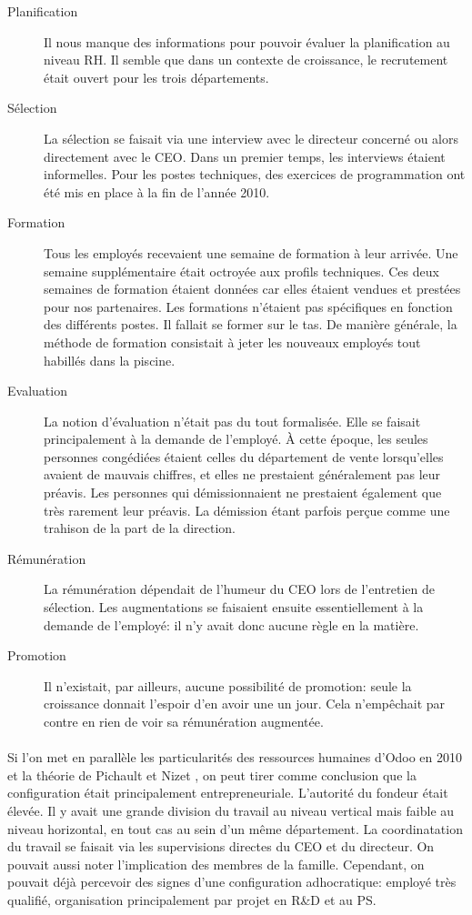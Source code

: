 \begin{description}
    \item[Planification] Il nous manque des informations pour pouvoir évaluer la planification au niveau RH. Il semble que dans un contexte de croissance, le recrutement était ouvert pour les trois départements.
    \item[Sélection] La sélection se faisait via une interview avec le directeur concerné ou alors directement avec le CEO. Dans un premier temps, les interviews étaient informelles. Pour les postes techniques, des exercices de programmation ont été mis en place à la fin de l'année 2010.
    \item[Formation] Tous les employés recevaient une semaine de formation à leur arrivée. Une semaine supplémentaire était octroyée aux profils techniques. Ces deux semaines de formation étaient données car elles étaient vendues et prestées pour nos partenaires. Les formations n'étaient pas spécifiques en fonction des différents postes. Il fallait se former sur le tas. De manière générale, la méthode de formation consistait à jeter les nouveaux employés tout habillés dans la piscine.
    \item[Evaluation] La notion d'évaluation n'était pas du tout formalisée. Elle se faisait principalement à la demande de l'employé. À cette époque, les seules personnes congédiées étaient celles du département de vente lorsqu'elles avaient de mauvais chiffres, et elles ne prestaient généralement pas leur préavis. Les personnes qui démissionnaient ne prestaient également que très rarement leur préavis. La démission étant parfois perçue comme une trahison de la part de la direction.
    \item[Rémunération] La rémunération dépendait de l'humeur du CEO lors de l'entretien de sélection. Les augmentations se faisaient ensuite essentiellement à la demande de l'employé: il n'y avait donc aucune règle en la matière. 
    \item[Promotion] Il n'existait, par ailleurs, aucune possibilité de promotion: seule la croissance donnait l'espoir d'en avoir une un jour. Cela n'empêchait par contre en rien de voir sa rémunération augmentée. 
\end{description}

 

\paragraph{}Si l'on met en parallèle les particularités des ressources humaines d'Odoo en 2010 et la théorie de Pichault et Nizet \citep[pp. 48-49]{pichault}, on peut tirer comme conclusion que la configuration était principalement entrepreneuriale. L'autorité du fondeur était élevée. Il y avait une grande division du travail au niveau vertical mais faible au niveau horizontal, en tout cas au sein d'un même département. La coordinatation du travail se faisait via les supervisions directes du CEO et du directeur. On pouvait aussi noter l'implication des membres de la famille. Cependant, on pouvait déjà percevoir des signes d'une configuration adhocratique: employé très qualifié, organisation principalement par projet en R\&D et au PS. 

